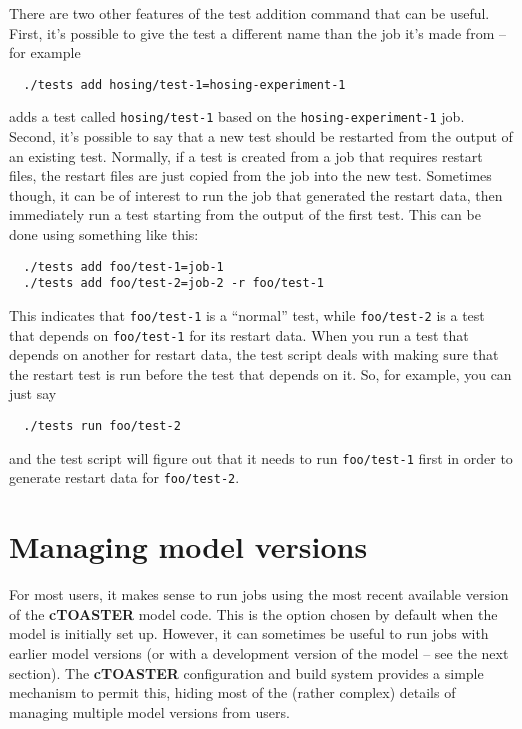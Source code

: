 \documentclass[a4paper,10pt,article]{memoir}
\begin{document}
There are two other features of the test addition command that can be
useful.  First, it's possible to give the test a different name than
the job it's made from -- for example
\begin{verbatim}
  ./tests add hosing/test-1=hosing-experiment-1
\end{verbatim}
adds a test called \texttt{hosing/test-1} based on the
\texttt{hosing-experiment-1} job.  Second, it's possible to say that a
new test should be restarted from the output of an existing test.
Normally, if a test is created from a job that requires restart files,
the restart files are just copied from the job into the new test.
Sometimes though, it can be of interest to run the job that generated
the restart data, then immediately run a test starting from the output
of the first test.  This can be done using something like this:
\begin{verbatim}
  ./tests add foo/test-1=job-1
  ./tests add foo/test-2=job-2 -r foo/test-1
\end{verbatim}
This indicates that \texttt{foo/test-1} is a ``normal'' test, while
\texttt{foo/test-2} is a test that depends on \texttt{foo/test-1} for
its restart data.  When you run a test that depends on another for
restart data, the test script deals with making sure that the restart
test is run before the test that depends on it.  So, for example, you
can just say
\begin{verbatim}
  ./tests run foo/test-2
\end{verbatim}
and the test script will figure out that it needs to run
\texttt{foo/test-1} first in order to generate restart data for
\texttt{foo/test-2}.

\section{Managing model versions}

For most users, it makes sense to run jobs using the most recent
available version of the \textbf{cTOASTER} model code.  This is the option chosen
by default when the model is initially set up.  However, it can
sometimes be useful to run jobs with earlier model versions (or with a
development version of the model -- see the next section).  The \textbf{cTOASTER}
configuration and build system provides a simple mechanism to permit
this, hiding most of the (rather complex) details of managing multiple
model versions from users.
\end{document}

